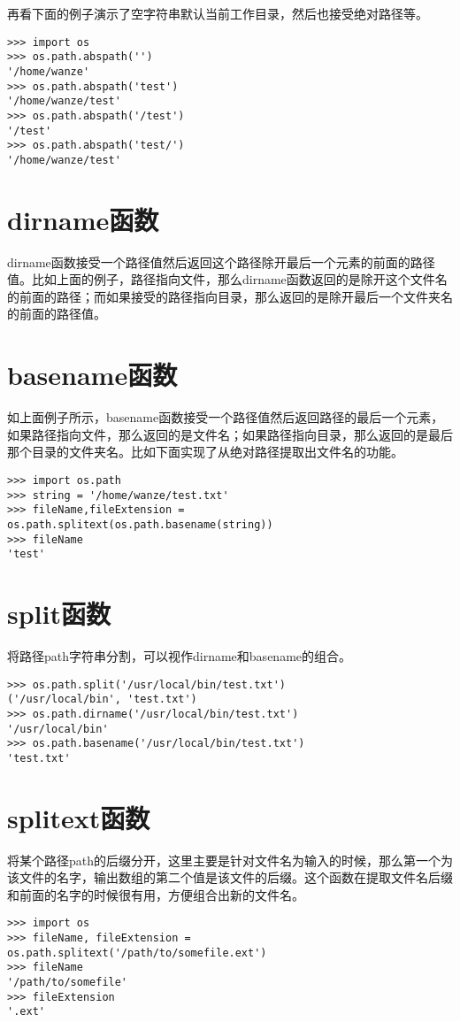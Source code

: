 \documentclass[12pt,oneside]{book}
\begin{document}
\begin{common-format}
再看下面的例子演示了空字符串默认当前工作目录，然后也接受绝对路径等。
\begin{Verbatim}
>>> import os
>>> os.path.abspath('')
'/home/wanze'
>>> os.path.abspath('test')
'/home/wanze/test'
>>> os.path.abspath('/test')
'/test'
>>> os.path.abspath('test/')
'/home/wanze/test'
\end{Verbatim}

\section{dirname函数}
dirname函数接受一个路径值然后返回这个路径除开最后一个元素的前面的路径值。比如上面的例子，路径指向文件，那么dirname函数返回的是除开这个文件名的前面的路径；而如果接受的路径指向目录，那么返回的是除开最后一个文件夹名的前面的路径值。

\section{basename函数}
如上面例子所示，basename函数接受一个路径值然后返回路径的最后一个元素，如果路径指向文件，那么返回的是文件名；如果路径指向目录，那么返回的是最后那个目录的文件夹名。比如下面实现了从绝对路径提取出文件名的功能。
\begin{Verbatim}
>>> import os.path
>>> string = '/home/wanze/test.txt'
>>> fileName,fileExtension = os.path.splitext(os.path.basename(string))
>>> fileName
'test'
\end{Verbatim}




\section{split函数}
将路径path字符串分割，可以视作dirname和basename的组合。
\begin{Verbatim}
>>> os.path.split('/usr/local/bin/test.txt')
('/usr/local/bin', 'test.txt')
>>> os.path.dirname('/usr/local/bin/test.txt')
'/usr/local/bin'
>>> os.path.basename('/usr/local/bin/test.txt')
'test.txt'
\end{Verbatim}



\section{splitext函数}
将某个路径path的后缀分开，这里主要是针对文件名为输入的时候，那么第一个为该文件的名字，输出数组的第二个值是该文件的后缀。这个函数在提取文件名后缀和前面的名字的时候很有用，方便组合出新的文件名。
\begin{Verbatim}
>>> import os
>>> fileName, fileExtension = os.path.splitext('/path/to/somefile.ext')
>>> fileName
'/path/to/somefile'
>>> fileExtension
'.ext'
\end{Verbatim}



\end{common-format}
\end{document}
